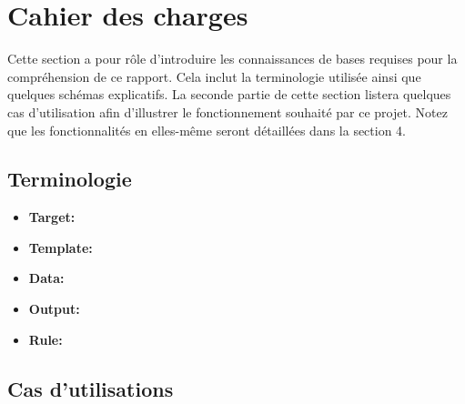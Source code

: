 \section{Cahier des charges}

	Cette section a pour rôle d'introduire les connaissances de bases requises pour la compréhension de ce rapport. Cela inclut la terminologie utilisée ainsi que quelques schémas explicatifs. La seconde partie de cette section listera quelques cas d'utilisation afin d'illustrer le fonctionnement souhaité par ce projet. Notez que les fonctionnalités en elles-même seront détaillées dans la section 4.
	
	\subsection{Terminologie}
		
		\begin{itemize}
			\item \textbf{Target:}
			\item \textbf{Template:}
			\item \textbf{Data:}
			\item \textbf{Output:}
			\item \textbf{Rule:} 
		\end{itemize}

	\subsection{Cas d'utilisations}
	
	